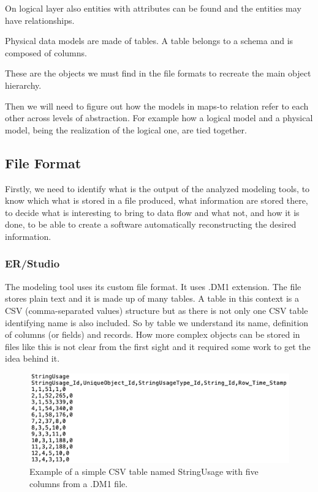 On logical layer also entities with attributes can be found and the entities may have relationships.

Physical data models are made of tables. A table belongs to a schema and is composed of columns.

These are the objects we must find in the file formats to recreate the main object hierarchy.

Then we will need to figure out how the models in maps-to relation refer to each other across levels of abstraction. For example how a logical model and a physical model, being the realization of the logical one, are tied together.

\subsection{File Format}

Firstly, we need to identify what is the output of the analyzed modeling tools, to know which what is stored in a file produced, what information are stored there, to decide what is interesting to bring to data flow and what not, and how it is done, to be able to create a software automatically reconstructing the desired information.

\subsubsection{ER/Studio}
\label{subsec:dm1_format}
The modeling tool uses its custom file format. It uses .DM1 extension. The file stores plain text and it is made up of many tables. A table in this context is a CSV (comma-separated values) structure but as there is not only one CSV table identifying name is also included. So by table we understand its name, definition of columns (or fields) and records.
How more complex objects can be stored in files like this is not clear from the first sight and it required some work to get the idea behind it. 

\begin{figure}[H]
	\centering
	\includegraphics[width=14cm]{../img/StringUsageTable}
	\caption[CSV Table]{Example of a simple CSV table named StringUsage with five columns from a .DM1 file.}
\end{figure}


